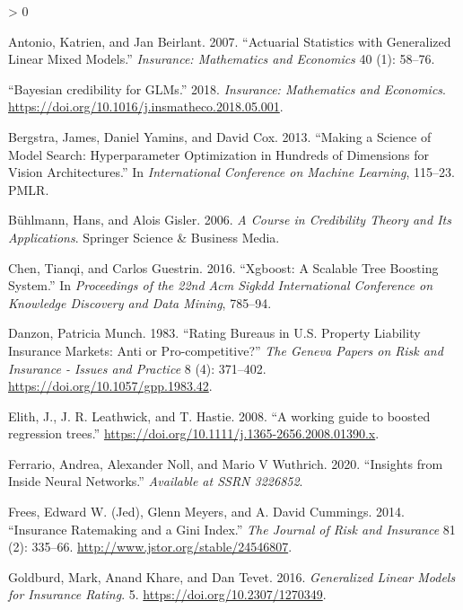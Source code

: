 \documentclass[
]{article}
\newlength{\cslhangindent}
\newenvironment{CSLReferences}[2] %
 {%
  \setlength{\parindent}{0pt}
  \ifodd #1 \everypar{\setlength{\hangindent}{\cslhangindent}}\ignorespaces\fi
  \ifnum #2 > 0
  \setlength{\parskip}{#2\baselineskip}
  \fi
 }%
 {}
\begin{document}
\hypertarget{refs}{}
\begin{CSLReferences}{1}{0}
\leavevmode\hypertarget{ref-antonio2007actuarial}{}%
Antonio, Katrien, and Jan Beirlant. 2007. {``Actuarial Statistics with
Generalized Linear Mixed Models.''} \emph{Insurance: Mathematics and
Economics} 40 (1): 58--76.

\leavevmode\hypertarget{ref-Xacur2018}{}%
{``{Bayesian credibility for GLMs}.''} 2018. \emph{Insurance:
Mathematics and Economics}.
\url{https://doi.org/10.1016/j.insmatheco.2018.05.001}.

\leavevmode\hypertarget{ref-bergstra2013making}{}%
Bergstra, James, Daniel Yamins, and David Cox. 2013. {``Making a Science
of Model Search: Hyperparameter Optimization in Hundreds of Dimensions
for Vision Architectures.''} In \emph{International Conference on
Machine Learning}, 115--23. PMLR.

\leavevmode\hypertarget{ref-buhlmann2006course}{}%
Bühlmann, Hans, and Alois Gisler. 2006. \emph{A Course in Credibility
Theory and Its Applications}. Springer Science \& Business Media.

\leavevmode\hypertarget{ref-chen2016xgboost}{}%
Chen, Tianqi, and Carlos Guestrin. 2016. {``Xgboost: A Scalable Tree
Boosting System.''} In \emph{Proceedings of the 22nd Acm Sigkdd
International Conference on Knowledge Discovery and Data Mining},
785--94.

\leavevmode\hypertarget{ref-Danzon1983}{}%
Danzon, Patricia Munch. 1983. {``{Rating Bureaus in U.S. Property
Liability Insurance Markets: Anti or Pro-competitive?}''} \emph{The
Geneva Papers on Risk and Insurance - Issues and Practice} 8 (4):
371--402. \url{https://doi.org/10.1057/gpp.1983.42}.

\leavevmode\hypertarget{ref-Elith2008}{}%
Elith, J., J. R. Leathwick, and T. Hastie. 2008. {``{A working guide to
boosted regression trees}.''}
\url{https://doi.org/10.1111/j.1365-2656.2008.01390.x}.

\leavevmode\hypertarget{ref-ferrario2020insights}{}%
Ferrario, Andrea, Alexander Noll, and Mario V Wuthrich. 2020.
{``Insights from Inside Neural Networks.''} \emph{Available at SSRN
3226852}.

\leavevmode\hypertarget{ref-giniFrees}{}%
Frees, Edward W. (Jed), Glenn Meyers, and A. David Cummings. 2014.
{``Insurance Ratemaking and a Gini Index.''} \emph{The Journal of Risk
and Insurance} 81 (2): 335--66.
\url{http://www.jstor.org/stable/24546807}.

\leavevmode\hypertarget{ref-goldburd2016generalized}{}%
Goldburd, Mark, Anand Khare, and Dan Tevet. 2016. \emph{{Generalized
Linear Models for Insurance Rating}}. 5.
\url{https://doi.org/10.2307/1270349}.


\end{CSLReferences}
\end{document}
